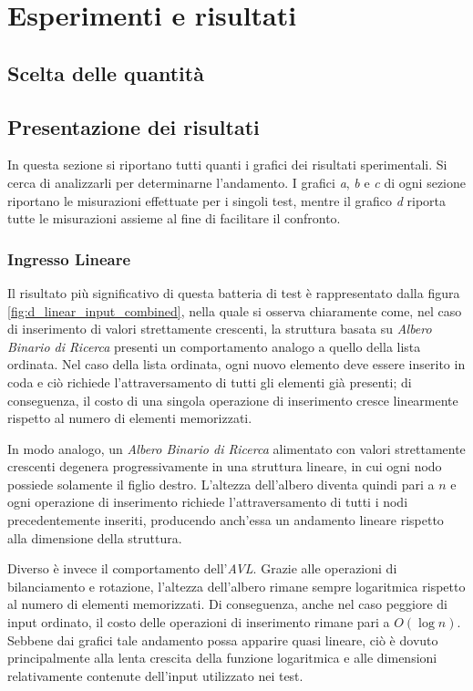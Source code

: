 \section{Esperimenti e risultati}

\subsection{Scelta delle quantità}


\subsection{Presentazione dei risultati}
In questa sezione si riportano tutti quanti i grafici dei risultati sperimentali. Si cerca di analizzarli per determinarne l'andamento. I grafici \textit{a}, \textit{b} e \textit{c} di ogni sezione riportano le misurazioni effettuate per i singoli test, mentre il grafico \textit{d} riporta tutte le misurazioni assieme al fine di facilitare il confronto.


\subsubsection*{Ingresso Lineare}

Il risultato più significativo di questa batteria di test è rappresentato dalla figura \ref{fig:d_linear_input_combined}, nella quale si osserva chiaramente come, nel caso di inserimento di valori strettamente crescenti, la struttura basata su \textit{Albero Binario di Ricerca} presenti un comportamento analogo a quello della lista ordinata. Nel caso della lista ordinata, ogni nuovo elemento deve essere inserito in coda e ciò richiede l'attraversamento di tutti gli elementi già presenti; di conseguenza, il costo di una singola operazione di inserimento cresce linearmente rispetto al numero di elementi memorizzati.

In modo analogo, un \textit{Albero Binario di Ricerca} alimentato con valori strettamente crescenti degenera progressivamente in una struttura lineare, in cui ogni nodo possiede solamente il figlio destro. L'altezza dell'albero diventa quindi pari a $n$ e ogni operazione di inserimento richiede l'attraversamento di tutti i nodi precedentemente inseriti, producendo anch'essa un andamento lineare rispetto alla dimensione della struttura.

Diverso è invece il comportamento dell'\textit{AVL}. Grazie alle operazioni di bilanciamento e rotazione, l'altezza dell'albero rimane sempre logaritmica rispetto al numero di elementi memorizzati. Di conseguenza, anche nel caso peggiore di input ordinato, il costo delle operazioni di inserimento rimane pari a $O(\log n)$. Sebbene dai grafici tale andamento possa apparire quasi lineare, ciò è dovuto principalmente alla lenta crescita della funzione logaritmica e alle dimensioni relativamente contenute dell'input utilizzato nei test.

